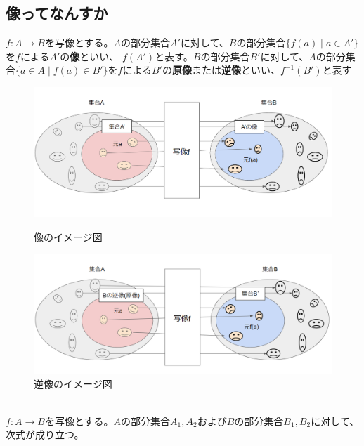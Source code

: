 \documentclass[a4j,dvipdfmx]{jsarticle}
\begin{document}
\subsection{像ってなんすか}
$f:A\to B$を写像とする。$A$の部分集合$A'$に対して、$B$の部分集合$\{f(a)\mid a\in A'\}$を$f$による$A'$の\textbf{像}といい、
$f(A')$と表す。$B$の部分集合$B'$に対して、$A$の部分集合$\{a\in A \mid f(a)\in B'\}$を$f$による$B'$の\textbf{原像}または\textbf{逆像}といい、$f^{-1}(B')$と表す

\begin{figure}[h]
    \begin{minipage}{0.5\linewidth}
        \centering
        \includegraphics[keepaspectratio,scale=0.35]{img/写像_像.png}
        \caption{像のイメージ図}
      \end{minipage}
      \begin{minipage}{0.6\linewidth}
        \centering
        \includegraphics[keepaspectratio, scale=0.35]{img/写像_逆増.png}
        \caption{逆像のイメージ図}
      \end{minipage}
\end{figure}
\hrulefill\\
$f:A\to B$を写像とする。$A$の部分集合$A_1,A_2$および$B$の部分集合$B_1,B_2$に対して、次式が成り立つ。
\end{document}
